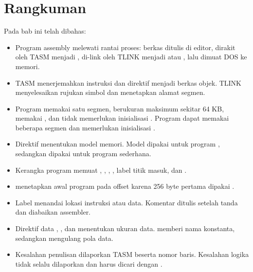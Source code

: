 \section{Rangkuman}
\label{sec:rangkuman-bab7}

Pada bab ini telah dibahas:

\begin{itemize}
    \item Program assembly melewati rantai proses: berkas
           ditulis di editor, dirakit oleh TASM menjadi
          , di-link oleh TLINK menjadi  atau
          , lalu dimuat DOS ke memori.

    \item TASM menerjemahkan instruksi dan direktif menjadi berkas
          objek. TLINK menyelesaikan rujukan simbol dan menetapkan
          alamat segmen.

    \item Program  memakai satu segmen, berukuran
          maksimum sekitar 64 KB, memakai , dan tidak
          memerlukan inisialisasi . Program 
          dapat memakai beberapa segmen dan memerlukan inisialisasi
          .

    \item Direktif  menentukan model memori. Model
           dipakai untuk program , sedangkan
           dipakai untuk program  sederhana.

    \item Kerangka program memuat , ,
          , , label titik masuk, dan
          .

    \item {} menetapkan awal program  pada
          offset  karena 256 byte pertama dipakai
          .

    \item Label menandai lokasi instruksi atau data. Komentar
          ditulis setelah tanda \code{;} dan diabaikan assembler.

    \item Direktif data , , dan  menentukan
          ukuran data.  memberi nama konstanta, sedangkan
           mengulang pola data.

    \item Kesalahan penulisan dilaporkan TASM beserta nomor baris.
          Kesalahan logika tidak selalu dilaporkan dan harus dicari
          dengan .
\end{itemize}

